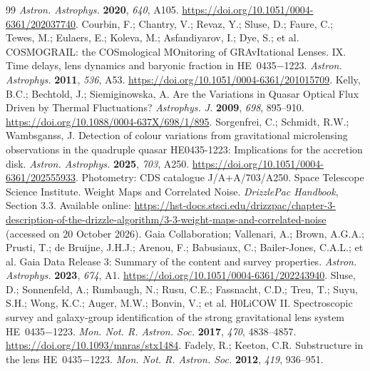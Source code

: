 \documentclass[galaxies,article,submit,oneauthor]{Definitions/mdpi}
\begin{document}
\begin{thebibliography}{99}
\emph{Astron. Astrophys.} \textbf{2020}, \emph{640}, A105.
\href{https://doi.org/10.1051/0004-6361/202037740}{https://doi.org/10.1051/0004-6361/202037740}.
Courbin, F.; Chantry, V.; Revaz, Y.; Sluse, D.; Faure, C.; Tewes, M.;
Eulaers, E.; Koleva, M.; Asfandiyarov, I.; Dye, S.; et al.
COSMOGRAIL: the COSmological MOnitoring of GRAvItational Lenses.
IX. Time delays, lens dynamics and baryonic fraction in HE~0435$-$1223.
\emph{Astron. Astrophys.} \textbf{2011}, \emph{536}, A53.
\href{https://doi.org/10.1051/0004-6361/201015709}{https://doi.org/10.1051/0004-6361/201015709}.
Kelly, B.C.; Bechtold, J.; Siemiginowska, A.
Are the Variations in Quasar Optical Flux Driven by Thermal Fluctuations?
\emph{Astrophys. J.} \textbf{2009}, \emph{698}, 895--910.
\href{https://doi.org/10.1088/0004-637X/698/1/895}{https://doi.org/10.1088/0004-637X/698/1/895}.
Sorgenfrei, C.; Schmidt, R.W.; Wambsganss, J.
Detection of colour variations from gravitational microlensing observations
in the quadruple quasar HE0435-1223: Implications for the accretion disk.
\emph{Astron. Astrophys.} \textbf{2025}, \emph{703}, A250.
\href{https://doi.org/10.1051/0004-6361/202555933}{https://doi.org/10.1051/0004-6361/202555933}.
Photometry: CDS catalogue J/A+A/703/A250.
Space Telescope Science Institute.
Weight Maps and Correlated Noise. \emph{DrizzlePac Handbook}, Section 3.3.
Available online:
\url{https://hst-docs.stsci.edu/drizzpac/chapter-3-description-of-the-drizzle-algorithm/3-3-weight-maps-and-correlated-noise}
(accessed on 20 October 2026).
Gaia Collaboration; Vallenari, A.; Brown, A.G.A.; Prusti, T.;
de Bruijne, J.H.J.; Arenou, F.; Babusiaux, C.; Bailer-Jones, C.A.L.; et al.
Gaia Data Release 3: Summary of the content and survey properties.
\emph{Astron. Astrophys.} \textbf{2023}, \emph{674}, A1.
\href{https://doi.org/10.1051/0004-6361/202243940}{https://doi.org/10.1051/0004-6361/202243940}.
Sluse, D.; Sonnenfeld, A.; Rumbaugh, N.; Rusu, C.E.; Fassnacht, C.D.;
Treu, T.; Suyu, S.H.; Wong, K.C.; Auger, M.W.; Bonvin, V.; et al.
H0LiCOW II. Spectroscopic survey and galaxy-group identification of the
strong gravitational lens system HE~0435$-$1223.
\emph{Mon. Not. R. Astron. Soc.} \textbf{2017}, \emph{470}, 4838--4857.
\href{https://doi.org/10.1093/mnras/stx1484}{https://doi.org/10.1093/mnras/stx1484}.
Fadely, R.; Keeton, C.R.
Substructure in the lens HE~0435$-$1223.
\emph{Mon. Not. R. Astron. Soc.} \textbf{2012}, \emph{419}, 936--951.

\end{thebibliography}
\end{document}
